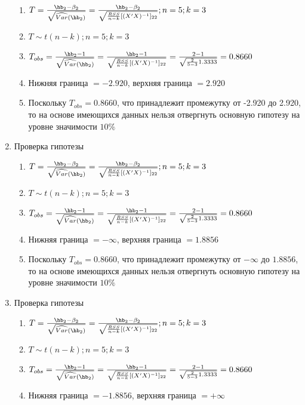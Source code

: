 \documentclass[pdftex,11pt,openany]{book}\usepackage[]{graphicx}\usepackage[]{color}
\begin{document}
\begin{solution}
\begin{enumerate}
\begin{enumerate}
\item $T = \frac{\hb_2 - \beta_2}{\sqrt{\widehat{Var}(\hb_2)}} = \frac {\hb_2 - \beta_2}{\sqrt{{\frac{RSS}{n-k}}[(X'X)^{-1}]_{22}}}; n = 5; k = 3$
\item $T \sim t(n-k); n = 5; k = 3$
\item $T_{obs} = \frac{\hb_2 - 1}{\sqrt{\widehat{Var}(\hb_2)}} = \frac {\hb_2 - 1}{\sqrt{{\frac{RSS}{n-k}}[(X'X)^{-1}]_{22}}} = \frac{2-1}{\sqrt{{\frac{2}{5-3}}1.3333}} = 0.8660$
\item Нижняя граница $= -2.920$, верхняя граница $= 2.920$
\item Поскольку $T_{obs} = 0.8660$, что принадлежит промежутку от -2.920 до 2.920, то на основе имеющихся данных нельзя отвергнуть основную гипотезу на уровне значимости $10\%$
\end{enumerate}
\item Проверка гипотезы
\begin{enumerate}
\item $T = \frac{\hb_2 - \beta_2}{\sqrt{\widehat{Var}(\hb_2)}} = \frac {\hb_2 - \beta_2}{\sqrt{{\frac{RSS}{n-k}}[(X'X)^{-1}]_{22}}}; n = 5; k = 3$
\item $T \sim t(n-k); n = 5; k = 3$
\item $T_{obs} = \frac{\hb_2 - 1}{\sqrt{\widehat{Var}(\hb_2)}} = \frac {\hb_2 - 1}{\sqrt{{\frac{RSS}{n-k}}[(X'X)^{-1}]_{22}}} = \frac{2-1}{\sqrt{{\frac{2}{5-3}}1.3333}} = 0.8660$
\item Нижняя граница $= -\infty$, верхняя граница $= 1.8856$
\item Поскольку $T_{obs} = 0.8660$, что принадлежит промежутку от $-\infty$ до $1.8856$, то на основе имеющихся данных нельзя отвергнуть основную гипотезу на уровне значимости $10\%$
\end{enumerate}
\item Проверка гипотезы
\begin{enumerate}
\item $T = \frac{\hb_2 - \beta_2}{\sqrt{\widehat{Var}(\hb_2)}} = \frac {\hb_2 - \beta_2}{\sqrt{{\frac{RSS}{n-k}}[(X'X)^{-1}]_{22}}}; n = 5; k = 3$
\item $T \sim t(n-k); n = 5; k = 3$
\item $T_{obs} = \frac{\hb_2 - 1}{\sqrt{\widehat{Var}(\hb_2)}} = \frac {\hb_2 - 1}{\sqrt{{\frac{RSS}{n-k}}[(X'X)^{-1}]_{22}}} = \frac{2-1}{\sqrt{{\frac{2}{5-3}}1.3333}} = 0.8660$
\item Нижняя граница $= -1.8856$, верхняя граница $= +\infty$

\end{enumerate}
\end{enumerate}
\end{solution}
\end{document}
